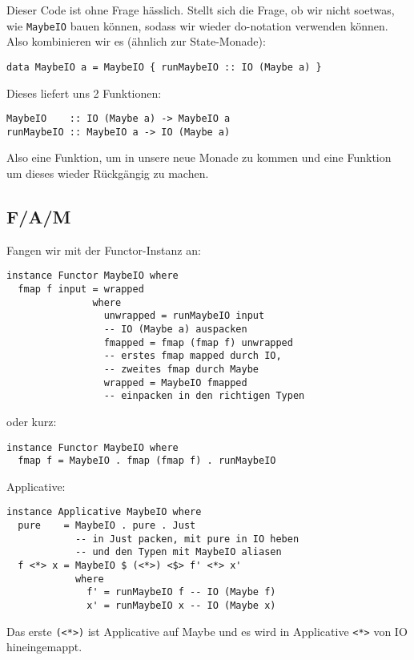 \documentclass{beamer}
\begin{document}
\begin{frame}[fragile]
Dieser Code ist ohne Frage hässlich. Stellt sich die Frage, ob wir nicht soetwas, wie \texttt{MaybeIO} bauen können, sodass wir wieder do-notation verwenden können.\\
\pause
Also kombinieren wir es (ähnlich zur State-Monade):
\begin{verbatim}
data MaybeIO a = MaybeIO { runMaybeIO :: IO (Maybe a) }
\end{verbatim}
\pause
Dieses liefert uns 2 Funktionen:
\begin{verbatim}
MaybeIO    :: IO (Maybe a) -> MaybeIO a
runMaybeIO :: MaybeIO a -> IO (Maybe a)
\end{verbatim}
Also eine Funktion, um in unsere neue Monade zu kommen und eine Funktion um dieses wieder Rückgängig zu machen.
\end{frame}

\subsection{F/A/M}
\begin{frame}[fragile]
Fangen wir mit der Functor-Instanz an:
\begin{verbatim}
instance Functor MaybeIO where
  fmap f input = wrapped
               where
                 unwrapped = runMaybeIO input
                 -- IO (Maybe a) auspacken
                 fmapped = fmap (fmap f) unwrapped
                 -- erstes fmap mapped durch IO,
                 -- zweites fmap durch Maybe
                 wrapped = MaybeIO fmapped
                 -- einpacken in den richtigen Typen
\end{verbatim}
\pause
oder kurz:
\begin{verbatim}
instance Functor MaybeIO where
  fmap f = MaybeIO . fmap (fmap f) . runMaybeIO
\end{verbatim}
\end{frame}

\begin{frame}[fragile]
Applicative:
\begin{verbatim}
instance Applicative MaybeIO where
  pure    = MaybeIO . pure . Just
            -- in Just packen, mit pure in IO heben
            -- und den Typen mit MaybeIO aliasen
  f <*> x = MaybeIO $ (<*>) <$> f' <*> x'
            where
              f' = runMaybeIO f -- IO (Maybe f)
              x' = runMaybeIO x -- IO (Maybe x)
\end{verbatim}
Das erste \texttt{(<*>)} ist Applicative auf Maybe und es wird in Applicative \texttt{<*>} von IO hineingemappt.
\end{frame}
\end{document}

